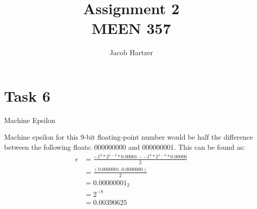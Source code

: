 \documentclass[12pt]{article}
\newenvironment{problem}[2][Problem]{\begin{trivlist}
\item[\hskip \labelsep {\bfseries #1}\hskip \labelsep {\bfseries #2.}]}{\end{trivlist}}
\begin{document}
 
 
\title{Assignment 2\\ MEEN 357}
\author{Jacob Hartzer}
\maketitle
 
 \section*{Task 6}
\begin{problem} {1} Machine Epsilon

Machine epsilon for this 9-bit floating-point number would be half the difference between the following floats: 000000000 and 000000001. This can be found as:
\begin{align*}
\epsilon &= \frac{-1^0 * 2^{1-3} * 0.00001 - -1^0 * 2^{1-3} * 0.00000}{2} \\
& = \frac{(0.0000001 – 0.0000000)}{2}\\
& = 0.00000001_2\\
&= 2^{-8}\\
&=0.00390625
\end{align*}

\end{problem} 
\end{document}
